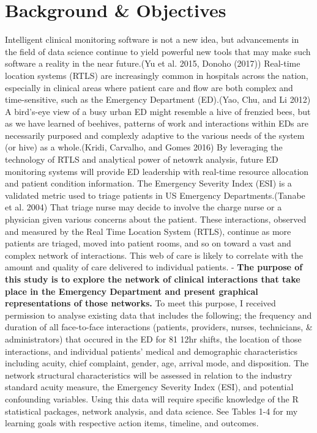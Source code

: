 \documentclass[]{elsarticle} %
\begin{document}
\section{Background \& Objectives}\label{background-objectives}

Intelligent clinical monitoring software is not a new idea, but
advancements in the field of data science continue to yield powerful new
tools that may make such software a reality in the near future.(Yu et
al. 2015, Donoho (2017)) Real-time location systems (RTLS) are
increasingly common in hospitals across the nation, especially in
clinical areas where patient care and flow are both complex and
time-sensitive, such as the Emergency Department (ED).(Yao, Chu, and Li
2012) A bird's-eye view of a busy urban ED might resemble a hive of
frenzied bees, but as we have learned of beehives, patterns of work and
interactions within EDs are necessarily purposed and complexly adaptive
to the various needs of the system (or hive) as a whole.(Kridi,
Carvalho, and Gomes 2016) By leveraging the technology of RTLS and
analytical power of netowrk analysis, future ED monitoring systems will
provide ED leadership with real-time resource allocation and patient
condition information. The Emergency Severity Index (ESI) is a validated
metric used to triage patients in US Emergency Departments.(Tanabe et
al. 2004) That triage nurse may decide to involve the charge nurse or a
physician given various concerns about the patient. These interactions,
observed and measured by the Real Time Location System (RTLS), continue
as more patients are triaged, moved into patient rooms, and so on toward
a vast and complex network of interactions. This web of care is likely
to correlate with the amount and quality of care delivered to individual
patients. - \textbf{The purpose of this study is to explore the network
of clinical interactions that take place in the Emergency Department and
present graphical representations of those networks.} To meet this
purpose, I received permission to analyse existing data that includes
the following; the frequency and duration of all face-to-face
interactions (patients, providers, nurses, technicians, \&
administrators) that occured in the ED for 81 12hr shifts, the location
of those interactions, and individual patients' medical and demographic
characteristics including acuity, chief complaint, gender, age, arrival
mode, and disposition. The network structural characteristics will be
assessed in relation to the industry standard acuity measure, the
Emergency Severity Index (ESI), and potential confounding variables.
Using this data will require specific knowledge of the R statistical
packages, network analysis, and data science. See Tables 1-4 for my
learning goals with respective action items, timeline, and outcomes.
\end{document}
